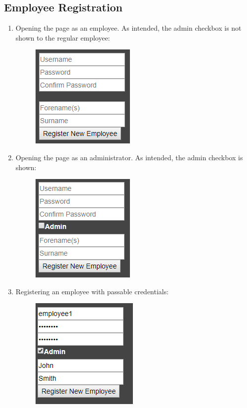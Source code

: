﻿\documentclass{article}
\begin{document}
    \subsection{Employee Registration}
    \begin{enumerate}
        \item Opening the page as an employee.
        As intended, the admin checkbox is not shown to the regular employee:
        \begin{figure}[H]
            \includegraphics{testing/empReg1.png}
            \centering
        \end{figure}
        \item Opening the page as an administrator.
        As intended, the admin checkbox is shown:
        \begin{figure}[H]
            \includegraphics{testing/empReg2.png}
            \centering
        \end{figure}
        \item Registering an employee with passable credentials:
        \begin{figure}[H]
            \includegraphics{testing/empReg3.png}

\end{figure}
\end{enumerate}
\end{document}
